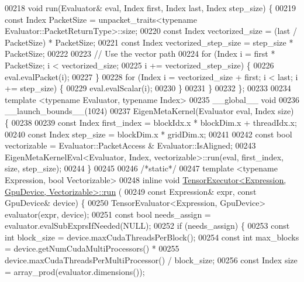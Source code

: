 \begin{DoxyCode}
{00218   \textcolor{keywordtype}{void} run(Evaluator& eval, Index first, Index last, Index step\_size) \{
00219     \textcolor{keyword}{const} Index PacketSize = unpacket\_traits<typename Evaluator::PacketReturnType>::size;
00220     \textcolor{keyword}{const} Index vectorized\_size = (last / PacketSize) * PacketSize;
00221     \textcolor{keyword}{const} Index vectorized\_step\_size = step\_size * PacketSize;
00222 
00223     \textcolor{comment}{// Use the vector path}
00224     \textcolor{keywordflow}{for} (Index i = first * PacketSize; i < vectorized\_size;
00225          i += vectorized\_step\_size) \{
00226       eval.evalPacket(i);
00227     \}
00228     \textcolor{keywordflow}{for} (Index i = vectorized\_size + first; i < last; i += step\_size) \{
00229       eval.evalScalar(i);
00230     \}
00231   \}
00232 \};
00233 
00234 \textcolor{keyword}{template} <\textcolor{keyword}{typename} Evaluator, \textcolor{keyword}{typename} Index>
00235 \_\_global\_\_ \textcolor{keywordtype}{void}
00236 \_\_launch\_bounds\_\_(1024)
00237 EigenMetaKernel(Evaluator eval, Index size) \{
00238 
00239   \textcolor{keyword}{const} Index first\_index = blockIdx.x * blockDim.x + threadIdx.x;
00240   \textcolor{keyword}{const} Index step\_size = blockDim.x * gridDim.x;
00241 
00242   \textcolor{keyword}{const} \textcolor{keywordtype}{bool} vectorizable = Evaluator::PacketAccess & Evaluator::IsAligned;
00243   EigenMetaKernelEval<Evaluator, Index, vectorizable>::run(eval, first\_index, size, step\_size);
00244 \}
00245 
00246 \textcolor{comment}{/*static*/}
00247 \textcolor{keyword}{template} <\textcolor{keyword}{typename} Expression, \textcolor{keywordtype}{bool} Vectorizable>
00248 \textcolor{keyword}{inline} \textcolor{keywordtype}{void} \hyperlink{class_tensor_executor}{TensorExecutor<Expression, GpuDevice, Vectorizable>::run}
      (
00249     \textcolor{keyword}{const} Expression& expr, \textcolor{keyword}{const} GpuDevice& device) \{
00250   TensorEvaluator<Expression, GpuDevice> evaluator(expr, device);
00251   \textcolor{keyword}{const} \textcolor{keywordtype}{bool} needs\_assign = evaluator.evalSubExprsIfNeeded(NULL);
00252   \textcolor{keywordflow}{if} (needs\_assign) \{
00253     \textcolor{keyword}{const} \textcolor{keywordtype}{int} block\_size = device.maxCudaThreadsPerBlock();
00254     \textcolor{keyword}{const} \textcolor{keywordtype}{int} max\_blocks = device.getNumCudaMultiProcessors() *
00255                            device.maxCudaThreadsPerMultiProcessor() / block\_size;
00256     \textcolor{keyword}{const} Index size = array\_prod(evaluator.dimensions());
}
\end{DoxyCode}
